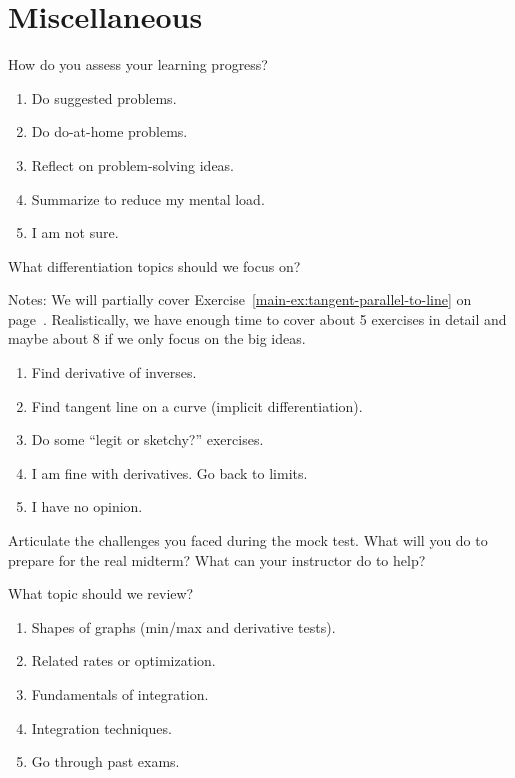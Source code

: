 \documentclass[aspectratio=169, 14pt, t]{beamer}  %
\begin{document}
\section{Miscellaneous}

\begin{poll}
  How do you assess your learning progress?

  \begin{enumerate}
    \item Do suggested problems.
    \item Do do-at-home problems.
    \item Reflect on problem-solving ideas.
    \item Summarize to reduce my mental load.
    \item I am not sure.
  \end{enumerate}
\end{poll}

\begin{poll}
  What differentiation topics should we focus on?

  {\small Notes: We will partially cover Exercise~\ref{main-ex:tangent-parallel-to-line} on page~\pageref{main-ex:tangent-parallel-to-line}. Realistically, we have enough time to cover about 5 exercises in detail and maybe about 8 if we only focus on the big ideas.}

  \begin{enumerate}
    \item Find derivative of inverses.
    \item Find tangent line on a curve (implicit differentiation).
    \item Do some ``legit or sketchy?'' exercises.
    \item I am fine with derivatives. Go back to limits.
    \item I have no opinion.
  \end{enumerate}
\end{poll}

\begin{poll}[c]
  Articulate the challenges you faced during the mock test. What will you do to prepare for the real midterm? What can your instructor do to help?
\end{poll}

\begin{poll}
  What topic should we review?

  \begin{enumerate}
    \item Shapes of graphs (min/max and derivative tests).
    \item Related rates or optimization.
    \item Fundamentals of integration.
    \item Integration techniques.
    \item Go through past exams.
  \end{enumerate}
\end{poll}
\end{document}
